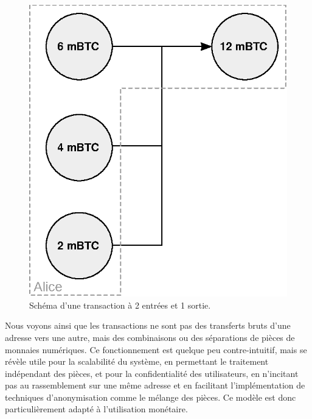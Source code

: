 \begin{figure}[ht]
  \centering
  \includegraphics[scale=0.75]{img/transaction-3i-1o.eps}
  \caption{Schéma d'une transaction à 2 entrées et 1 sortie.}
  \label{fig:transaction-3i-1o}
\end{figure}

Nous voyons ainsi que les transactions ne sont pas des transferts bruts d'une adresse vers une autre, mais des combinaisons ou des séparations de pièces de monnaies numériques. Ce fonctionnement est quelque peu contre-intuitif, mais se révèle utile pour la scalabilité du système, en permettant le traitement indépendant des pièces, et pour la confidentialité des utilisateurs, en n'incitant pas au rassemblement sur une même adresse et en facilitant l'implémentation de techniques d'anonymisation comme le mélange des pièces. Ce modèle est donc particulièrement adapté à l'utilisation monétaire.

%
%

